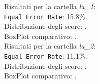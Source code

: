\documentclass[12pt,a4paper,openright,twoside]{book}
\begin{document}
\noindent Risultati per la cartella \textit{la\_1}: \\
\texttt{Equal Error Rate}: 15.8\%. \\
Distribuzione degli score: . \\
BoxPlot comparativo: . \\

\noindent Risultati per la cartella \textit{la\_2}: \\
\texttt{Equal Error Rate}: 11.1\%. \\
Distribuzione degli score: . \\
BoxPlot comparativo: . 
\end{document}
